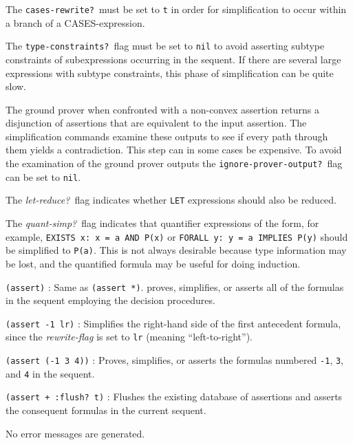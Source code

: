 \documentclass[12pt,twoside]{book}
\newenvironment{usage}[1]{\item[usage:\hspace*{-0.175in}]#1\begin{description}\setlength{\itemindent}{-0.2in}\setlength{\itemsep}{0.1in}}{\end{description}}
\begin{document}
\begin{description}
The \texttt{cases-rewrite?}\ must be set to \texttt{t} in order for
simplification to occur within a branch of a CASES-expression.

The \texttt{type-constraints?}\ flag must be set to \texttt{nil} to
avoid asserting subtype constraints of subexpressions occurring in the
sequent.  If there are several large expressions with subtype constraints,
this phase of simplification can be quite slow.

The ground prover when confronted with a non-convex assertion returns a
disjunction of assertions that are equivalent to the input assertion.  The
simplification commands examine these outputs to see if every path through
them yields a contradiction.  This step can in some cases be expensive.
To avoid the examination of the ground prover outputs the
\texttt{ignore-prover-output?}\ flag can be set to \texttt{nil}.

The \emph{let-reduce?}\ flag indicates whether \texttt{LET} expressions
should also be reduced.

The \emph{quant-simp?}\ flag indicates that quantifier expressions of the
form, for example, \texttt{EXISTS x: x = a AND P(x)} or \texttt{FORALL y:
y = a IMPLIES P(y)} should be simplified to \texttt{P(a)}.  This is not
always desirable because type information may be lost, and the quantified
formula may be useful for doing induction.



\begin{usage}{}

\item[\texttt{(assert)}] : Same as \texttt{(assert *)}.  proves, simplifies, or
asserts all of the formulas in the sequent employing the decision
procedures.

\item[\texttt{(assert -1 lr)}] : Simplifies the right-hand side of the first
antecedent formula, since the \emph{rewrite-flag} is set to \texttt{lr}
(meaning ``left-to-right'').

\item[\texttt{(assert (-1 3 4))}] : Proves, simplifies, or asserts the
formulas numbered \texttt{-1}, \texttt{3}, and \texttt{4} in the sequent.

\item[\texttt{(assert + :flush?\ t)}] : Flushes the existing database of
assertions and asserts the consequent formulas in the current sequent.
\end{usage}

\item[errors:] No error messages are generated.


\end{description}
\end{document}
